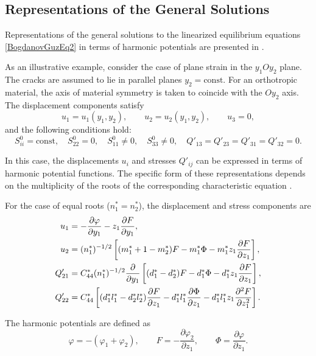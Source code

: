 \subsection{Representations of the General Solutions}

Representations of the general solutions to the linearized equilibrium equations \eqref{BogdanovGuzEq2} in terms of harmonic potentials are presented in \cite{BogdanovGuz28,BogdanovGuz31,BogdanovGuz32}.

As an illustrative example, consider the case of plane strain in the $y_1 O y_2$ plane. The cracks are assumed to lie in parallel planes $y_2=\text{const}$. For an orthotropic material, the axis of material symmetry is taken to coincide with the $O y_2$ axis. The displacement components satisfy
\[
u_1 = u_1(y_1,y_2), 
\qquad
u_2 = u_2(y_1,y_2), 
\qquad
u_3 = 0,
\]
and the following conditions hold:
\begin{equation}
	\label{BogdanovGuzEq7}
	S_{ii}^{0}=\text{const}, 
	\quad
	S_{22}^{0}=0,
	\quad
	S_{11}^{0}\neq 0,
	\quad
	S_{33}^{0}\neq 0,
	\quad
	Q'_{13}=Q'_{23}=Q'_{31}=Q'_{32}=0.
\end{equation}

In this case, the displacements $u_i$ and stresses $Q'_{ij}$ can be expressed in terms of harmonic potential functions. The specific form of these representations depends on the multiplicity of the roots of the corresponding characteristic equation \cite{BogdanovGuz28,BogdanovGuz31}.

For the case of equal roots ($n_1^* = n_2^*$), the displacement and stress components are
\begin{align}
u_1
&=
-\frac{\partial \varphi}{\partial y_1}
-
z_1 \frac{\partial F}{\partial y_1},
\notag \\
u_2
&=
(n_1^*)^{-1/2}
\left[
(m_1^*+1-m_2^*)F
-
m_1^*\Phi
-
m_1^* z_1 \frac{\partial F}{\partial z_1}
\right],
\notag \\
	Q'_{21}
	&=
	C_{44}^*(n_1^*)^{-1/2}
	\frac{\partial}{\partial y_1}
	\left[
	(d_1^*-d_2^*)F
	-
	d_1^*\Phi
	-
	d_1^* z_1 \frac{\partial F}{\partial z_1}
	\right],
\label{BogdanovGuzEq8} \\
Q'_{22}
&=
C_{44}^*
\left[
(d_1^*l_1^*-d_2^*l_2^*)\frac{\partial F}{\partial z_1}
-
d_1^*l_1^* \frac{\partial \Phi}{\partial z_1}
-
d_1^*l_1^* z_1 \frac{\partial^2 F}{\partial z_1^2}
\right].
\notag
\end{align}

The harmonic potentials are defined as
\[
\varphi = -(\varphi_1 + \varphi_2),
\qquad
F = -\frac{\partial \varphi_2}{\partial z_1},
\qquad
\Phi = \frac{\partial \varphi}{\partial z_1}.
\]

